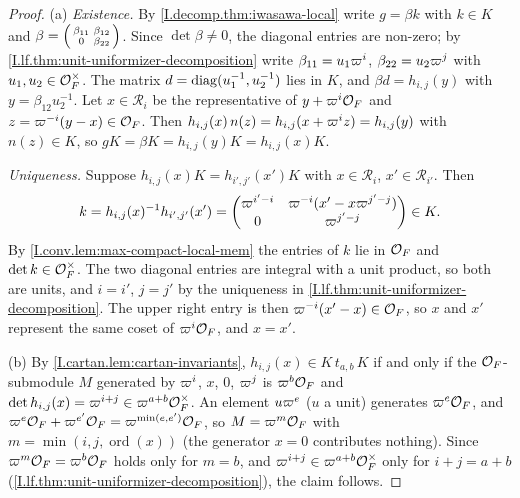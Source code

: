 \begin{lemma}
\end{lemma}
\begin{proof}
(a) \emph{Existence.} By \cref{I.decomp.thm:iwasawa-local} write $g=\beta k$ with $k\in K$ and
$\beta=\begin{psmallmatrix}\beta_{11}&\beta_{12}\\0&\beta_{22}\end{psmallmatrix}$. Since $\det\beta\neq0$, the diagonal
entries are non-zero; by \cref{I.lf.thm:unit-uniformizer-decomposition} write $\beta_{11}=u_1\varpi^i$,
$\beta_{22}=u_2\varpi^j$ with $u_1,u_2\in\mathcal{O}_F^\times$. The matrix $d=\operatorname{diag}(u_1^{-1},u_2^{-1})$ lies in $K$, and
$\beta d=h_{i,j}(y)$ with $y=\beta_{12}u_2^{-1}$. Let $x\in\mathcal R_i$ be the representative of $y+\varpi^i\mathcal{O}_F$
and $z=\varpi^{-i}(y-x)\in\mathcal{O}_F$. Then $h_{i,j}(x)\,n(z)=h_{i,j}(x+\varpi^iz)=h_{i,j}(y)$ with $n(z)\in K$, so
$gK=\beta K=h_{i,j}(y)K=h_{i,j}(x)K$.

\emph{Uniqueness.} Suppose $h_{i,j}(x)K=h_{i',j'}(x')K$ with $x\in\mathcal R_i$, $x'\in\mathcal R_{i'}$. Then
\[
  k=h_{i,j}(x)^{-1}h_{i',j'}(x')=\begin{pmatrix}\varpi^{i'-i}&\varpi^{-i}(x'-x\varpi^{j'-j})\\0&\varpi^{j'-j}\end{pmatrix}\in K.
\]
By \cref{I.conv.lem:max-compact-local-mem} the entries of $k$ lie in $\mathcal{O}_F$ and $\det k\in\mathcal{O}_F^\times$. The
two diagonal entries are integral with a unit product, so both are units, and $i=i'$, $j=j'$ by the uniqueness
in \cref{I.lf.thm:unit-uniformizer-decomposition}. The upper right entry is then $\varpi^{-i}(x'-x)\in\mathcal{O}_F$, so
$x$ and $x'$ represent the same coset of $\varpi^i\mathcal{O}_F$, and $x=x'$.

(b) By \cref{I.cartan.lem:cartan-invariants}, $h_{i,j}(x)\in K\,t_{a,b}\,K$ if and only if the
$\mathcal{O}_F$-submodule $M$ generated by $\varpi^i$, $x$, $0$, $\varpi^j$ is $\varpi^b\mathcal{O}_F$ and
$\det h_{i,j}(x)=\varpi^{i+j}\in\varpi^{a+b}\mathcal{O}_F^\times$. An element $u\varpi^e$ ($u$ a unit) generates
$\varpi^e\mathcal{O}_F$, and $\varpi^e\mathcal{O}_F+\varpi^{e'}\mathcal{O}_F=\varpi^{\min(e,e')}\mathcal{O}_F$, so
$M=\varpi^m\mathcal{O}_F$ with $m=\min(i,j,\operatorname{ord}(x))$ (the generator $x=0$ contributes nothing). Since
$\varpi^m\mathcal{O}_F=\varpi^b\mathcal{O}_F$ holds only for $m=b$, and $\varpi^{i+j}\in\varpi^{a+b}\mathcal{O}_F^\times$ only for
$i+j=a+b$ (\cref{I.lf.thm:unit-uniformizer-decomposition}), the claim follows.
\end{proof}

